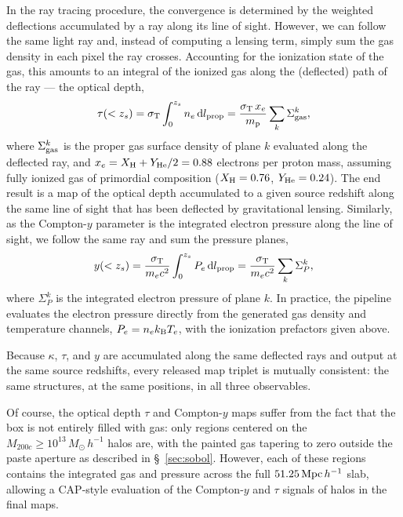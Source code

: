 \documentclass[linenumbers,trackchanges, twocolumn]{aastex701}
\begin{document}
In the ray tracing procedure, the convergence is determined by the weighted deflections accumulated by a ray along its line of sight. However, we can follow the same light ray and, instead of computing a lensing term, simply sum the gas density in each pixel the ray crosses. Accounting for the ionization state of the gas, this amounts to an integral of the ionized gas along the (deflected) path of the ray — the optical depth,
\begin{equation}\label{eq:tau}
    \tau(<z_s) = \sigma_{\rm T}\int_0^{z_s} n_e\,{\rm d}l_{\rm prop}
    = \frac{\sigma_{\rm T}\, x_e}{m_{\rm p}}\sum_{k} \Sigma^{k}_{\rm gas},
\end{equation}
where $\Sigma^k_{\rm gas}$ is the proper gas surface density of plane $k$ evaluated along the deflected ray, and $x_e = X_{\rm H} + Y_{\rm He}/2 = 0.88$ electrons per proton mass, assuming fully ionized gas of primordial composition ($X_{\rm H} = 0.76$, $Y_{\rm He} = 0.24$).
The end result is a map of the optical depth accumulated to a given source redshift along the same line of sight that has been deflected by gravitational lensing. Similarly, as the Compton-$y$ parameter is the integrated electron pressure along the line of sight, we follow the same ray and sum the pressure planes,
\begin{equation}\label{eq:compy}
    y(<z_s) = \frac{\sigma_{\rm T}}{m_e c^2}\int_0^{z_s} P_e\,{\rm d}l_{\rm prop}
    = \frac{\sigma_{\rm T}}{m_e c^2}\sum_{k} \Sigma^{k}_{P},
\end{equation}
where $\Sigma^k_P$ is the integrated electron pressure of plane $k$.
In practice, the pipeline evaluates the electron pressure directly from the generated gas density and temperature channels, $P_e = n_e k_{\rm B} T_e$, with the ionization prefactors given above.

Because $\kappa$, $\tau$, and $y$ are accumulated along the same deflected rays and output at the same source redshifts, every released map triplet is mutually consistent: the same structures, at the same positions, in all three observables.
 
Of course, the optical depth $\tau$ and Compton-$y$ maps suffer from the fact that the box is not entirely filled with gas: only regions centered on the $M_{200c}\geq10^{13}\,M_\odot\,h^{-1}$ halos are, with the painted gas tapering to zero outside the paste aperture as described in \S~\ref{sec:sobol}. However, each of these regions contains the integrated gas and pressure across the full $51.25\,{\rm Mpc}\,h^{-1}$ slab, allowing a CAP-style evaluation of the Compton-$y$ and $\tau$ signals of halos in the final maps.
\end{document}
